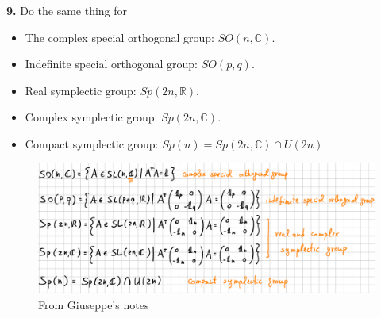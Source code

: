 \documentclass{book}
\theoremstyle{definition}
\newcommand{\R}{\mathbb{R}}
\newcommand{\C}{\mathbb{C}}
\begin{document}
\noindent \textbf{9.} Do the same thing for 
\begin{itemize}
	\item The complex special orthogonal group: $SO(n,\C)$.
	\item Indefinite special orthogonal group: $SO(p,q)$. 
	\item Real symplectic group: $Sp(2n,\R)$.
	\item Complex symplectic group: $Sp(2n,\C)$.
	\item Compact symplectic group: $Sp(n) = Sp(2n,\C)\cap U(2n)$.
\end{itemize}
\begin{figure}[!htb]
	\centering
	\includegraphics[scale=0.4]{lie3}
	\caption{From Giuseppe's notes}
\end{figure}
\end{document}

